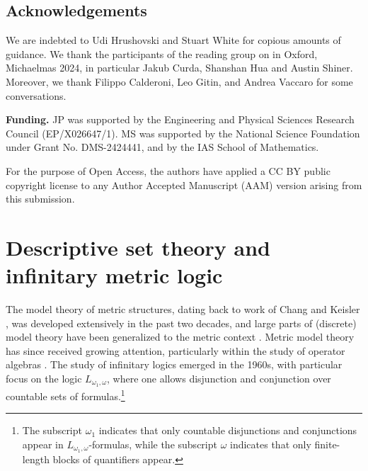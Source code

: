\documentclass[12pt]{amsart}
\begin{document}
\subsection*{Acknowledgements}
We are indebted to Udi Hrushovski and Stuart White for copious amounts of guidance. 
We thank the participants of the reading group on \cite{games_on_AF_algebras} in Oxford, Michaelmas 2024, in particular Jakub Curda, Shanshan Hua and Austin Shiner. Moreover, we thank Filippo Calderoni, Leo Gitin, and Andrea Vaccaro for some conversations.

\noindent
\textbf{Funding.} JP was supported by the Engineering and Physical Sciences Research Council (EP/X026647/1).
MS was supported by the National Science Foundation under Grant No. DMS-2424441, and by the IAS School of Mathematics. 

For the purpose of Open Access, the authors have applied a CC BY public copyright license to any Author Accepted Manuscript (AAM) version arising from this submission.


\section{Descriptive set theory and infinitary metric logic}\label{subsection: Metric Infinitary Logic}

The model theory of metric structures, dating back to work of Chang and Keisler \cite{chang_keisler_continuous}, was developed extensively in the past two decades, and large parts of (discrete) model theory have been generalized to the metric context \cite{MR2436146, Ben_Yaacov_2010}. Metric model theory has since received growing attention, particularly within the study of operator algebras \cite{farah2021MTofC*, Goldbring2023book, goldbring2022existentially, ioana2024existential, robert2025selfless}. The study of infinitary logics
emerged in the 1960s, with particular focus on the logic $L_{\omega_1, \omega}$, where one allows disjunction and conjunction over countable sets of formulas.\footnote{The subscript $\omega_1$ indicates that only countable disjunctions and conjunctions appear in $L_{\omega_1, \omega}$-formulas, while the subscript $\omega$ indicates that only finite-length blocks of quantifiers appear.} 
\end{document}
